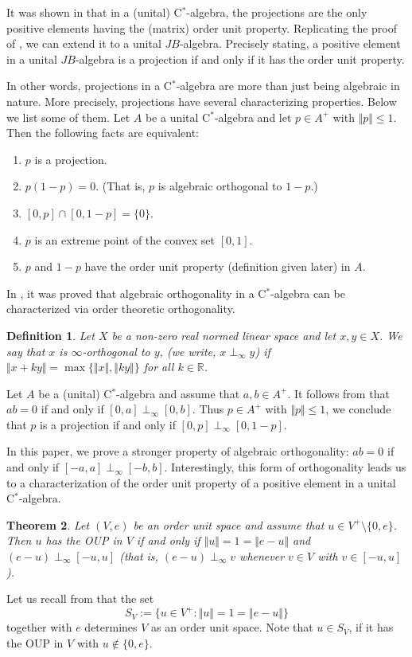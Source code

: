 \documentclass[12pt]{amsart}
\newtheorem{theorem}{Theorem}[section]
\newtheorem{definition}[theorem]{Definition}
\begin{document}
It was shown in \cite[(Corollary 3.2 and Theorem 3.3.)]{K4} that in a (unital) C$^*$-algebra, the projections are the only positive elements having the (matrix) order unit property. Replicating the proof of \cite[Theorem 3.3]{K4}, we can extend it to a unital $JB$-algebra. Precisely stating, a positive element in a unital $JB$-algebra is a projection if and only if it has the order unit property.

In other words, projections in a C$^*$-algebra are more than just being algebraic in nature. More precisely, projections have several characterizing properties. Below we list some of them. Let $A$ be a unital C$^*$-algebra and let $p \in A^+$ with $\Vert p \Vert \le 1$. Then the following facts are equivalent: 
\begin{enumerate}
	\item $p$ is a projection.
	\item $p (1 - p) = 0$. (That is, $p$ is algebraic orthogonal to $1 - p$.) 
	\item $[0, p] \cap [0, 1 - p] = \lbrace 0 \rbrace$.
	\item $p$ is an extreme point of the convex set $[0, 1]$. 
	\item $p$ and $1 - p$ have the order unit property (definition given later) in $A$.
\end{enumerate}
 In \cite{K18}, it was proved that algebraic orthogonality in a C$^*$-algebra can be characterized via order theoretic orthogonality. 
\begin{definition}\cite{K14} 
	Let $X$ be a non-zero real normed linear space and let $x, y \in X$. We say that $x$ is 	$\infty$-orthogonal to $y$, (we write, $x \perp_{\infty} y$) if $\Vert x + k y \Vert = \max \lbrace \Vert x \Vert, \Vert k y \Vert \rbrace$ for all $k \in \mathbb{R}$.
\end{definition} 
	Let $A$ be a (unital) C$^*$-algebra and assume that $a, b \in A^+$. It follows from \cite{K16, K18} that $a b = 0$ if and only if $[0, a] \perp_{\infty} [0, b]$. Thus $p \in A^+$ with $\Vert p \Vert \le 1$, we conclude that $p$ is a projection if and only if $[0, p] \perp_{\infty} [0, 1 - p]$. 
	
	In this paper, we prove a stronger property of algebraic orthogonality: $a b = 0$ if and only if $[- a, a] \perp_{\infty} [- b, b]$. Interestingly, this form of orthogonality leads us to a characterization of the order unit property of a positive element in a unital C$^*$-algebra.
\begin{theorem}\label{oup}
	Let $(V, e)$ be an order unit space and assume that $u \in V^+ \setminus \lbrace 0, e \rbrace$. Then $u$ has the OUP in $V$ if and only if $\Vert u \Vert = 1 = \Vert e - u \Vert$ and $(e - u) \perp_{\infty} [- u, u]$ (that is, $(e - u) \perp_{\infty} v$ whenever $v \in V$ with $v \in [- u, u]$). 
\end{theorem} 
Let us recall from \cite{K23} that the set 
$$S_V := \lbrace u \in V^+: \Vert u \Vert = 1 = \Vert e - u \Vert \rbrace$$ 
together with $e$ determines $V$ as an order unit space. Note that $u \in S_V$, if it has the OUP in $V$ with $u \notin \lbrace 0, e \rbrace$. 
\end{document}
